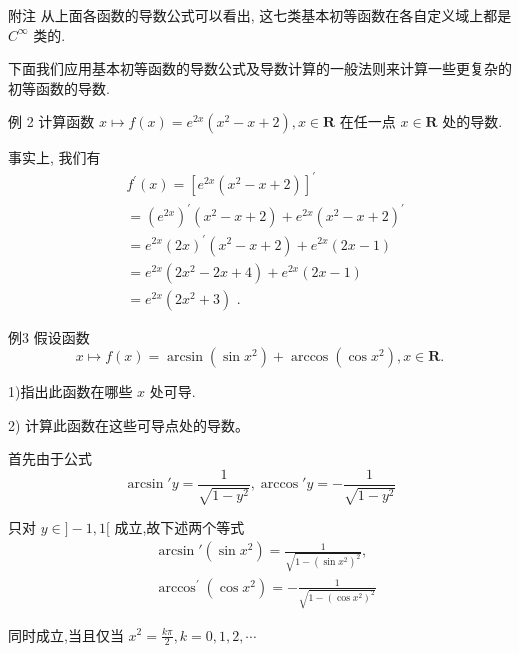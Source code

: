 附注 从上面各函数的导数公式可以看出, 这七类基本初等函数在各自定义域上都是 ${C}^{\infty }$ 类的.

下面我们应用基本初等函数的导数公式及导数计算的一般法则来计算一些更复杂的初等函数的导数.

例 2 计算函数 $x \mapsto  f\left( x\right)  = {e}^{2x}\left( {{x}^{2} - x + 2}\right) ,x \in  \mathbf{R}$ 在任一点 $x \in  \mathbf{R}$ 处的导数.

事实上, 我们有
\begin{align*}
	&{f}^{\prime }\left( x\right)  = {\left\lbrack  {e}^{2x}\left( {x}^{2} - x + 2\right) \right\rbrack  }^{\prime }\\
	&= {\left( {e}^{2x}\right) }^{\prime }\left( {{x}^{2} - x + 2}\right)  + {e}^{2x}{\left( {x}^{2} - x + 2\right) }^{\prime }\\
	&= {e}^{2x}{\left( 2x\right) }^{\prime }\left( {{x}^{2} - x + 2}\right)  + {e}^{2x}\left( {{2x} - 1}\right)\\
	&= {e}^{2x}\left( {2{x}^{2} - {2x} + 4}\right)  + {e}^{2x}\left( {{2x} - 1}\right)\\
	&= {e}^{2x}\left( {2{x}^{2} + 3}\right) \text{ . }
\end{align*}

例3 假设函数
$$x \mapsto  f\left( x\right)  = \arcsin \left( {\sin {x}^{2}}\right)  + \arccos \left( {\cos {x}^{2}}\right) ,x \in  \mathbf{R}.$$

1)指出此函数在哪些 $x$ 处可导.

2) 计算此函数在这些可导点处的导数。

首先由于公式
$$\arcsin \prime y = \frac{1}{\sqrt{1 - {y}^{2}}},\arccos \prime y =  - \frac{1}{\sqrt{1 - {y}^{2}}}$$

只对 $y \in  \rbrack  - 1,1\lbrack$ 成立,故下述两个等式
\begin{align*}
	&\arcsin \prime \left( {\sin {x}^{2}}\right)  = \frac{1}{\sqrt{1 - {\left( \sin {x}^{2}\right) }^{2}}},\\
	&{\arccos }^{\prime }\left( {\cos {x}^{2}}\right)  =  - \frac{1}{\sqrt{1 - {\left( \cos {x}^{2}\right) }^{2}}}
\end{align*}

同时成立,当且仅当 ${x}^{2} = \frac{k\pi }{2},k = 0,1,2,\cdots$

